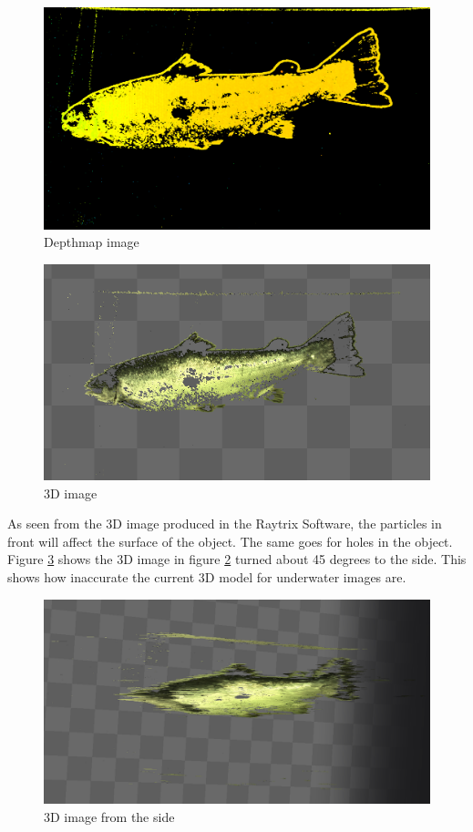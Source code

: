 \begin{figure}[H]
    \centering
    \includegraphics[width=.9\linewidth]{images/hardware/depthmap}
    \caption{Depthmap image}
    \label{fig:depthmap}
\end{figure}

\begin{figure}[H]
    \centering
    \includegraphics[width=.9\linewidth]{images/hardware/depth3D}
    \caption{3D image}
    \label{fig:3d_image}
\end{figure}

As seen from the 3D image produced in the Raytrix Software, the particles in front will affect the surface of the object. The same goes for holes in the object. Figure \ref{fig:3d_image_side} shows the 3D image in figure \ref{fig:3d_image} turned about 45 degrees to the side. This shows how inaccurate the current 3D model for underwater images are. 

\begin{figure}[H]
    \centering
    \includegraphics[width=.9\linewidth]{images/hardware/depth3D_side}
    \caption{3D image from the side}
    \label{fig:3d_image_side}
\end{figure}

